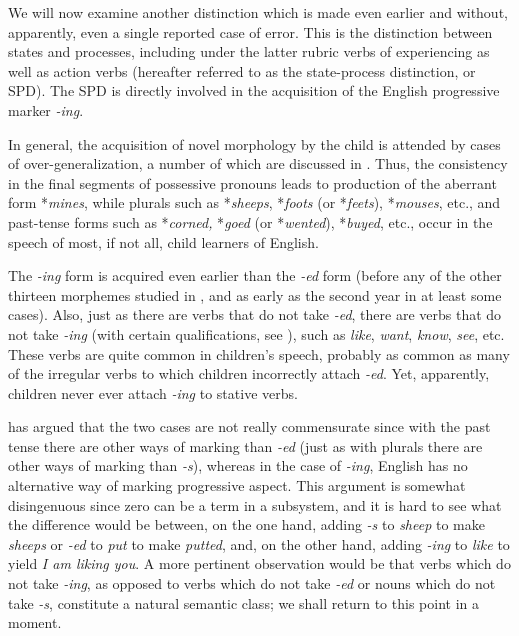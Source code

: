 We will now examine another distinction which is made even earlier and without, apparently, even a single reported case of error. This is the distinction between states and processes, including under the latter rubric verbs of experiencing as well as action verbs (hereafter referred to as the state-process distinction, or SPD). The SPD is di\-rectly involved in the acquisition of the English progressive marker \textit{-ing}.

In general, the acquisition of novel morphology by the child is attended by cases of over-generalization, a number of which are dis\-cussed in \citet{Cazden1968}. Thus, the consistency in the final segments of possessive pronouns leads to production of the aberrant form *\textit{mines}, while plurals such as *\textit{sheeps}, *\textit{foots} (or *\textit{feets}), *\textit{mouses}, etc., and past-tense forms such as *\textit{corned,} *\textit{goed} (or *\textit{wented}), *\textit{buyed}, etc., occur in the speech of most, if not all, child learners of English.

The \textit{-ing} form is acquired even earlier than the \textit{-ed} form (before any of the other thirteen morphemes studied in \citet{Brown1973}, and as early as the second year in at least some cases). Also, just as there are verbs that do not take \textit{-ed}, there are verbs that do not take \textit{-ing} (with certain qualifications, see \citealt{Sag1973}), such as \textit{like}, \textit{want}, \textit{know}, \textit{see}, etc. These verbs are quite common in children's speech, probably as common as many of the irregular verbs to which children incor\-rectly attach \textit{-ed}. Yet, apparently, children never ever attach \textit{-ing} to stative verbs.

\citet{Kuczaj1978} has argued that the two cases are not really commensurate since with the past tense there are other ways of mark\-ing than \textit{-ed} (just as with plurals there are other ways of marking than \textit{-s}), whereas in the case of \textit{-ing}, English has no alternative way of marking progressive aspect. This argument is somewhat disingenuous since zero can be a term in a subsystem, and it is hard to see what the difference would be between, on the one hand, adding \textit{-s} to \textit{sheep} to make \textit{sheeps} or \textit{-ed} to \textit{put} to make \textit{putted}, and, on the other hand, adding \textit{-ing} to \textit{like} to yield \textit{I am liking you}. A more pertinent observa\-tion would be that verbs which do not take \textit{-ing}, as opposed to verbs which do not take \textit{-ed} or nouns which do not take \textit{-s}, constitute a natural semantic class; we shall return to this point in a moment.

